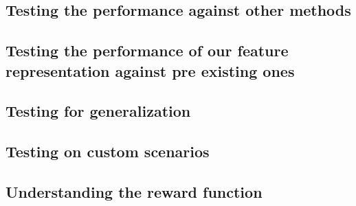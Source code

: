 \subsection*{Testing the performance against other methods}

\subsection*{Testing the performance of our feature representation against pre existing ones}

\subsection*{Testing for generalization}

\subsection*{Testing on custom scenarios}

\subsection*{Understanding the reward function}

